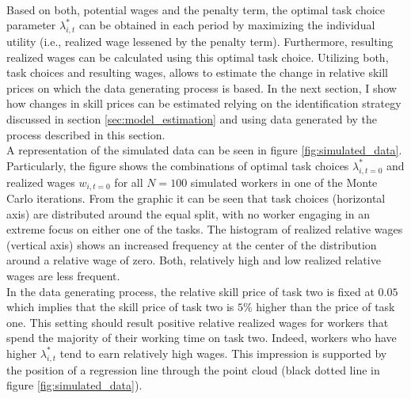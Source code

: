 \documentclass[../main.tex]{subfiles}
\begin{document}
\\
Based on both, potential wages and the penalty term, the optimal task choice parameter $\lambda_{i,t}^*$ can be obtained in each period by maximizing the individual utility (i.e., realized wage lessened by the penalty term). Furthermore, resulting realized wages can be calculated using this optimal task choice. Utilizing both, task choices and resulting wages, allows to estimate the change in relative skill prices on which the data generating process is based. In the next section, I show how changes in skill prices can be estimated relying on the identification strategy discussed in section \ref{sec:model_estimation} and using data generated by the process described in this section.
\\
A representation of the simulated data can be seen in figure \ref{fig:simulated_data}. Particularly, the figure shows the combinations of optimal task choices $\lambda_{i,t=0}^*$ and realized wages $w_{i,t=0}$ for all $N=100$ simulated workers in one of the Monte Carlo iterations. From the graphic it can be seen that task choices (horizontal axis) are distributed around the equal split, with no worker engaging in an extreme focus on either one of the tasks. The histogram of realized relative wages (vertical axis) shows an increased frequency at the center of the distribution around a relative wage of zero. Both, relatively high and low realized relative wages are less frequent.
\\
In the data generating process, the relative skill price of task two is fixed at $0.05$ which implies that the skill price of task two is $5 \%$ higher than the price of task one. This setting should result positive relative realized wages for workers that spend the majority of their working time on task two. Indeed, workers who have higher $\lambda_{i,t}^*$ tend to earn relatively high wages. This impression is supported by the position of a regression line through the point cloud (black dotted line in figure \ref{fig:simulated_data}).
\end{document}
